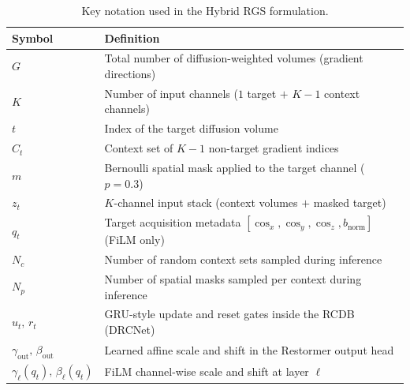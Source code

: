 \documentclass[preprint,12pt]{elsarticle}
\begin{document}
\begin{table}[ht]
  \centering
  \caption{Key notation used in the Hybrid RGS formulation.}
  \label{tab:notation}
  \begin{tabular}{ll}
    \toprule
    Symbol & Definition \\
    \midrule
    $G$ & Total number of diffusion-weighted volumes (gradient directions) \\
    $K$ & Number of input channels ($1$ target $+$ $K-1$ context channels) \\
    $t$ & Index of the target diffusion volume \\
    $C_t$ & Context set of $K-1$ non-target gradient indices \\
    $m$ & Bernoulli spatial mask applied to the target channel ($p=0.3$) \\
    $z_t$ & $K$-channel input stack (context volumes $+$ masked target) \\
    $q_t$ & Target acquisition metadata $[\cos_x,\cos_y,\cos_z,b_{\mathrm{norm}}]$ (FiLM only) \\
    $N_c$ & Number of random context sets sampled during inference \\
    $N_p$ & Number of spatial masks sampled per context during inference \\
    $u_t,\,r_t$ & GRU-style update and reset gates inside the RCDB (DRCNet) \\
    $\gamma_{\mathrm{out}},\,\beta_{\mathrm{out}}$ & Learned affine scale and shift in the Restormer output head \\
    $\gamma_\ell(q_t),\,\beta_\ell(q_t)$ & FiLM channel-wise scale and shift at layer $\ell$ \\
    \bottomrule
  \end{tabular}
\end{table}
\end{document}
